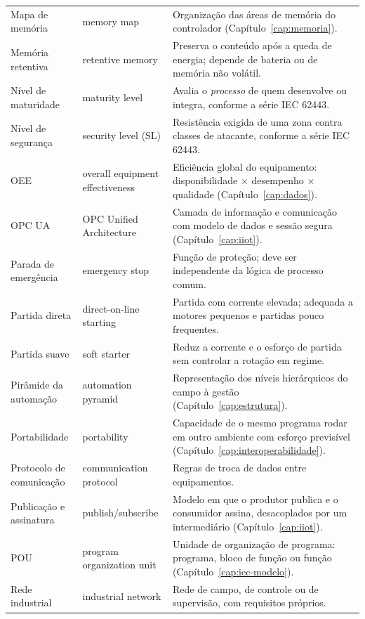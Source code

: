 \begin{longtable}{p{3.3cm} p{3.3cm} p{8.4cm}}
  Mapa de memória & memory map & Organização das áreas de memória do controlador
    (Capítulo~\ref{cap:memoria}). \\
  Memória retentiva & retentive memory & Preserva o conteúdo após a queda de energia; depende de
    bateria ou de memória não volátil. \\
  Nível de maturidade & maturity level & Avalia o \emph{processo} de quem desenvolve ou integra,
    conforme a série IEC 62443. \\
  Nível de segurança & security level (SL) & Resistência exigida de uma zona contra classes de
    atacante, conforme a série IEC 62443. \\
  OEE & overall equipment effectiveness & Eficiência global do equipamento: disponibilidade $\times$
    desempenho $\times$ qualidade (Capítulo~\ref{cap:dados}). \\
  OPC UA & OPC Unified Architecture & Camada de informação e comunicação com modelo de dados e sessão
    segura (Capítulo~\ref{cap:iiot}). \\
  Parada de emergência & emergency stop & Função de proteção; deve ser independente da lógica de
    processo comum. \\
  Partida direta & direct-on-line starting & Partida com corrente elevada; adequada a motores
    pequenos e partidas pouco frequentes. \\
  Partida suave & soft starter & Reduz a corrente e o esforço de partida sem controlar a rotação em
    regime. \\
  Pirâmide da automação & automation pyramid & Representação dos níveis hierárquicos do campo à
    gestão (Capítulo~\ref{cap:estrutura}). \\
  Portabilidade & portability & Capacidade de o mesmo programa rodar em outro ambiente com esforço
    previsível (Capítulo~\ref{cap:interoperabilidade}). \\
  Protocolo de comunicação & communication protocol & Regras de troca de dados entre equipamentos. \\
  Publicação e assinatura & publish/subscribe & Modelo em que o produtor publica e o consumidor
    assina, desacoplados por um intermediário (Capítulo~\ref{cap:iiot}). \\
  POU & program organization unit & Unidade de organização de programa: programa, bloco de função ou
    função (Capítulo~\ref{cap:iec-modelo}). \\
  Rede industrial & industrial network & Rede de campo, de controle ou de supervisão, com requisitos
    próprios. \\

\end{longtable}
